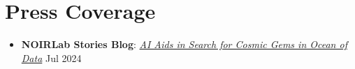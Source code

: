 \documentclass[a4paper,10pt]{article}
\begin{document}
\section*{Press Coverage}

\begin{itemize}
    \item \textbf{NOIRLab Stories Blog}: \href{https://noirlab.edu/public/blog/cosmic-gems/}{\textit{AI Aids in Search for Cosmic Gems in Ocean of Data}}
    \hfill Jul 2024
\end{itemize}
\end{document}
